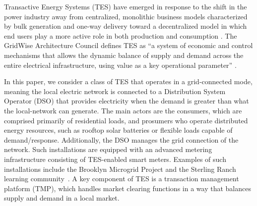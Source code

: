 Transactive Energy Systems (TES) have emerged in response to the shift in the power industry away from centralized, monolithic business models characterized by bulk generation and one-way delivery toward a decentralized model in which end users play a more active role in both production and consumption \cite{NIST_TE,Gridwise}.
The GridWise Architecture Council defines TES as ``a system of economic and control mechanisms that allows the dynamic balance of supply and demand across the entire electrical infrastructure, using value as a key operational parameter'' \cite{Gridwise}. 

In this paper, we consider a class of TES that operates in a grid-connected mode, meaning the local electric network is connected to a Distribution System Operator (DSO) that provides electricity when the demand is greater than what the local-network can generate. The main actors are the consumers, which are comprised primarily of residential loads, and prosumers who operate distributed energy resources, such as rooftop solar batteries or flexible loads capable of demand/response. Additionally, the DSO manages the grid connection of the network. Such installations are equipped with an advanced metering infrastructure consisting of TES-enabled smart meters.
Examples of such installations include the Brooklyn Microgrid Project \cite{BrooklynMicrogrid} and the Sterling Ranch learning community~\cite{SterlingRanch}. A key component of TES is a transaction management platform (TMP), which handles market clearing functions in a way that balances supply and demand in a local market.

